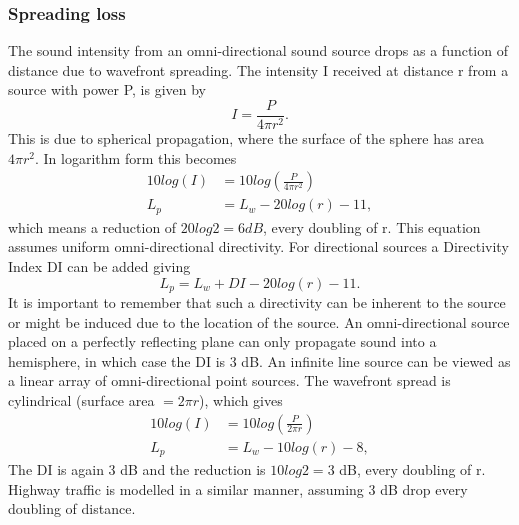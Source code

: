 \subsubsection{Spreading loss} 
The sound intensity from an omni-directional sound source drops as a function of distance due to wavefront spreading. The intensity I received at distance r from a source with power P, is given by
\begin{equation}
    I = \frac{P}{4\pi r^2}.
\end{equation}
This is due to spherical propagation, where the surface of the sphere has area $4\pi r^2$. In logarithm form this becomes
\begin{equation}
\begin{split}
    10log(I) &= 10log(\frac{P}{4\pi r^2}) \\
    L_p &= L_w - 20 log(r) - 11,
\end{split}
\end{equation}
which means a reduction of $20log2 = 6 dB$, every doubling of r. This equation assumes uniform omni-directional directivity. For directional sources a Directivity Index DI can be added giving
\begin{equation}
    L_p = L_w + DI - 20 log(r) - 11.
\end{equation}
It is important to remember that such a directivity can be inherent to the source or might be induced due to the location of the source. An omni-directional source placed on a perfectly reflecting plane can only propagate sound into a hemisphere, in which case the DI is 3 dB.  
An infinite line source can be viewed as a linear array of omni-directional point sources. The wavefront spread is cylindrical (surface area $= 2\pi r$),  which gives
\begin{equation}
\begin{split}
    10log(I) &= 10log(\frac{P}{2\pi r}) \\
    L_p &= L_w - 10 log(r) - 8,
\end{split}
\end{equation}
The DI is again 3 dB and the reduction is $10log2 = 3$ dB, every doubling of r. Highway traffic is modelled in a similar manner, assuming 3 dB drop every doubling of distance.
